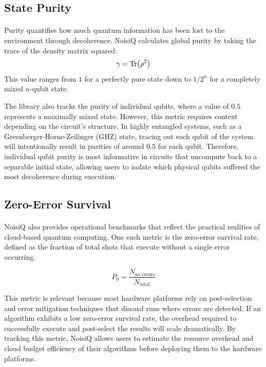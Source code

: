 \documentclass[10pt,twocolumn]{article}
\begin{document}
\subsection{State Purity}
\label{subsec:purity}
\paragraph{}
    Purity quantifies how much quantum information has been lost to the environment through decoherence. 
NoisiQ calculates global purity by taking the trace of the density matrix squared:
\begin{equation}
    \gamma = \Tr(\rho^2)
\end{equation}
    This value ranges from $1$ for a perfectly pure state down to $1/2^n$ for a completely mixed $n$-qubit state. 

    The library also tracks the purity of individual qubits, where a value of $0.5$ represents a maximally mixed state. 
However, this metric requires context depending on the circuit's structure. 
In highly entangled systems, such as a Greenberger-Horne-Zeilinger (GHZ) state, tracing out each qubit of the system will intentionally result in purities of around $0.5$ for each qubit. 
Therefore, individual qubit purity is most informative in circuits that uncompute back to a separable initial state, 
allowing users to isolate which physical qubits suffered the most decoherence during execution.

\subsection{Zero-Error Survival}
\label{subsec:zero_error}
\paragraph{}
    NoisiQ also provides operational benchmarks that reflect the practical realities of cloud-based quantum computing. 
One such metric is the zero-error survival rate, defined as the fraction of total shots that execute without a single error occurring. 

\begin{equation}
    P_0 = \frac{N_{\text{no errors}}}{N_{\text{total}}}
\end{equation}

    This metric is relevant because most hardware platforms rely on post-selection and error mitigation techniques that discard runs where errors are detected. 
If an algorithm exhibits a low zero-error survival rate, the overhead required to successfully execute and post-select the results will scale dramatically. 
By tracking this metric, NoisiQ allows users to estimate the resource overhead and cloud budget efficiency of their algorithms before deploying them to the hardware platforms.
\end{document}
